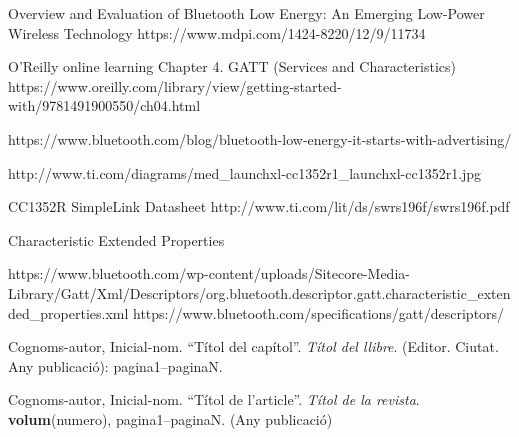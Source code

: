 \begin{thebibliography}{2}
Overview and Evaluation of Bluetooth Low Energy: An Emerging Low-Power Wireless Technology
https://www.mdpi.com/1424-8220/12/9/11734

O’Reilly online learning
Chapter 4. GATT (Services and Characteristics)
https://www.oreilly.com/library/view/getting-started-with/9781491900550/ch04.html

https://www.bluetooth.com/blog/bluetooth-low-energy-it-starts-with-advertising/

http://www.ti.com/diagrams/med\_launchxl-cc1352r1\_launchxl-cc1352r1.jpg

CC1352R SimpleLink Datasheet
http://www.ti.com/lit/ds/swrs196f/swrs196f.pdf

Characteristic Extended Properties

https://www.bluetooth.com/wp-content/uploads/Sitecore-Media-Library/Gatt/Xml/Descriptors/org.bluetooth.descriptor.gatt.characteristic\_extended\_properties.xml
https://www.bluetooth.com/specifications/gatt/descriptors/

Cognoms-autor, Inicial-nom.
``Títol del capítol''. {\it Títol del llibre}.
(Editor. Ciutat. Any publicació): pagina1--paginaN.

Cognoms-autor, Inicial-nom.
``Títol de l'article''. {\it Títol de la revista}.
{\bf volum}(numero),
pagina1--paginaN. (Any publicació) 



\end{thebibliography}